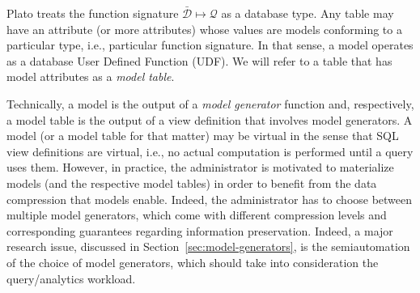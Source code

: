 Plato treats the function signature $\mathcal{\bar{D}}\mapsto \mathcal{Q}$ as a database type. 
Any table may have an attribute (or more attributes) whose values are models conforming to a particular type, i.e., particular function signature. In that sense, a model operates as a database User Defined Function (UDF).
We will refer to a table that has model attributes as a {\em model table}. 

Technically, a model is the output of a {\em model generator} function and, respectively, a model table is the output of a view definition that involves model generators. A model (or a model table for that matter) may be virtual in the sense that SQL view definitions are virtual, i.e., no actual computation is performed until a query uses them. However, in practice, the administrator is motivated to materialize models (and the  respective model tables) in order to benefit from the data compression that models enable. Indeed, the administrator has to choose between multiple model generators, which come with different compression levels and corresponding guarantees regarding information preservation. Indeed, a major research issue, discussed in Section~\ref{sec:model-generators}, is the semiautomation of the choice of model generators, which should take into consideration the query/analytics workload.

